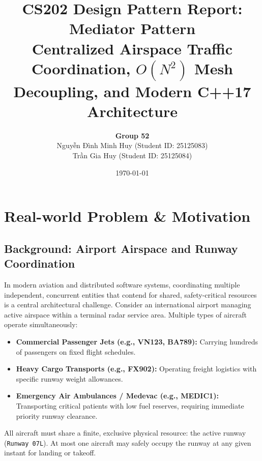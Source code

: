 \documentclass[12pt,a4paper]{article}
\title{\textbf{CS202 Design Pattern Report: Mediator Pattern}\\\large Centralized Airspace Traffic Coordination, $O(N^2)$ Mesh Decoupling, and Modern C++17 Architecture}
\author{\textbf{Group 52} \\ {\fontencoding{T5}\selectfont Nguyễn Đình Minh Huy} (Student ID: 25125083) \\ {\fontencoding{T5}\selectfont Trần Gia Huy} (Student ID: 25125084)}
\date{\today}
\begin{document}
\maketitle
\tableofcontents
\newpage

\section{Real-world Problem \& Motivation}

\subsection{Background: Airport Airspace and Runway Coordination}
In modern aviation and distributed software systems, coordinating multiple independent, concurrent entities that contend for shared, safety-critical resources is a central architectural challenge. Consider an international airport managing active airspace within a terminal radar service area. Multiple types of aircraft operate simultaneously:
\begin{itemize}
    \item \textbf{Commercial Passenger Jets (e.g., VN123, BA789):} Carrying hundreds of passengers on fixed flight schedules.
    \item \textbf{Heavy Cargo Transports (e.g., FX902):} Operating freight logistics with specific runway weight allowances.
    \item \textbf{Emergency Air Ambulances / Medevac (e.g., MEDIC1):} Transporting critical patients with low fuel reserves, requiring immediate priority runway clearance.
\end{itemize}

All aircraft must share a finite, exclusive physical resource: the active runway (\texttt{Runway 07L}). At most one aircraft may safely occupy the runway at any given instant for landing or takeoff.
\end{document}

